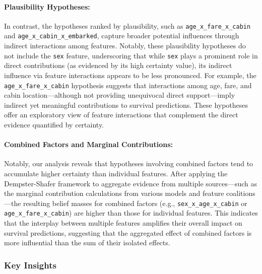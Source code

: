 \documentclass[acmlarge]{acmart}
\begin{document}
\paragraph{Plausibility Hypotheses:}
In contrast, the hypotheses ranked by plausibility, such as \texttt{age\_x\_fare\_x\_cabin} and \texttt{age\_x\_cabin\_x\_embarked}, capture broader potential influences through indirect interactions among features. Notably, these plausibility hypotheses do not include the \texttt{sex} feature, underscoring that while \texttt{sex} plays a prominent role in direct contributions (as evidenced by its high certainty value), its indirect influence via feature interactions appears to be less pronounced. For example, the \texttt{age\_x\_fare\_x\_cabin} hypothesis suggests that interactions among age, fare, and cabin location—although not providing unequivocal direct support—imply indirect yet meaningful contributions to survival predictions. These hypotheses offer an exploratory view of feature interactions that complement the direct evidence quantified by certainty.

\paragraph{Combined Factors and Marginal Contributions:}
Notably, our analysis reveals that hypotheses involving combined factors tend to accumulate higher certainty than individual features. After applying the Dempster-Shafer framework to aggregate evidence from multiple sources—such as the marginal contribution calculations from various models and feature coalitions—the resulting belief masses for combined factors (e.g., \texttt{sex\_x\_age\_x\_cabin} or \texttt{age\_x\_fare\_x\_cabin}) are higher than those for individual features. This indicates that the interplay between multiple features amplifies their overall impact on survival predictions, suggesting that the aggregated effect of combined factors is more influential than the sum of their isolated effects.

\subsubsection{Key Insights}
\end{document}

